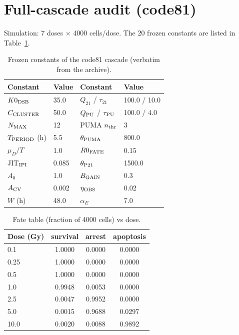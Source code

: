 \documentclass[11pt]{article}
\begin{document}
\section{Full-cascade audit (code81)}
\label{sec:code81}

Simulation: 7 doses $\times$ 4000 cells/dose. The 20 frozen constants are
listed in Table~\ref{tab:c81const}.

\begin{table}[h]
\centering\small
\caption{Frozen constants of the code81 cascade (verbatim from the archive).}
\label{tab:c81const}
\begin{tabular}{llll}
\toprule
Constant & Value & Constant & Value \\
\midrule
$K0_{\rm DSB}$ & 35.0 & $Q_{21}$ / $\tau_{21}$ & 100.0 / 10.0 \\
$C_{\rm CLUSTER}$ & 50.0 & $Q_{\rm PU}$ / $\tau_{\rm PU}$ & 100.0 / 4.0 \\
$N_{\rm MAX}$ & 12 & PUMA $n_{\rm thr}$ & 3 \\
$T_{\rm PERIOD}$ (h) & 5.5 & $\theta_{\rm PUMA}$ & 800.0 \\
$\mu_D/T$ & 1.0 & $R0_{\rm FATE}$ & 0.15 \\
JIT$_{\rm IPI}$ & 0.085 & $\theta_{\rm P21}$ & 1500.0 \\
$A_0$ & 1.0 & $B_{\rm GAIN}$ & 0.3 \\
$A_{\rm CV}$ & 0.002 & $\eta_{\rm OBS}$ & 0.02 \\
$W$ (h) & 48.0 & $\alpha_E$ & 7.0 \\
\bottomrule
\end{tabular}
\end{table}

\begin{table}[h]
\centering\small
\caption{Fate table (fraction of 4000 cells) vs dose.}
\label{tab:fate}
\begin{tabular}{lccc}
\toprule
Dose (Gy) & survival & arrest & apoptosis \\
\midrule
0.1 & 1.0000 & 0.0000 & 0.0000 \\
0.25 & 1.0000 & 0.0000 & 0.0000 \\
0.5 & 1.0000 & 0.0000 & 0.0000 \\
1.0 & 0.9948 & 0.0053 & 0.0000 \\
2.5 & 0.0047 & 0.9952 & 0.0000 \\
5.0 & 0.0015 & 0.9688 & 0.0297 \\
10.0 & 0.0020 & 0.0088 & 0.9892 \\
\bottomrule
\end{tabular}
\end{table}
\end{document}
